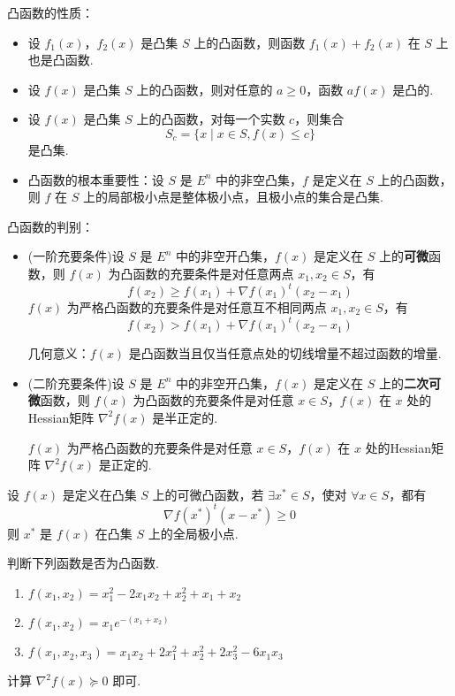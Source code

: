 \begin{theorem}
    凸函数的性质：
    \begin{itemize}
        \item 设 $f_1(x)$，$f_2(x)$ 是凸集 $S$ 上的凸函数，则函数 $f_1(x) + f_2(x)$ 在 $S$ 上也是凸函数.
        \item 设 $f(x)$ 是凸集 $S$ 上的凸函数，则对任意的 $a \ge 0$，函数 $af(x)$ 是凸的.
        \item 设 $f(x)$ 是凸集 $S$ 上的凸函数，对每一个实数 $c$，则集合 
        \[
            S_c = \{x \mid x \in S, f(x) \le c\}  
        \]
        是凸集.
        \item 凸函数的根本重要性：设 $S$ 是 $E^n$ 中的非空凸集，$f$ 是定义在 $S$ 上的凸函数，则 $f$ 在 $S$ 上的局部极小点是整体极小点，且极小点的集合是凸集.
    \end{itemize}
\end{theorem}

\begin{theorem}
    凸函数的判别：
    \begin{itemize}
        \item (一阶充要条件)设 $S$ 是 $E^n$ 中的非空开凸集，$f(x)$ 是定义在 $S$ 上的\textbf{可微}函数，则 $f(x)$ 为凸函数的充要条件是对任意两点 $x_1, x_2 \in S$，有 \[f(x_2) \ge f(x_1) + \nabla f(x_1)^t(x_2 - x_1)\]
        $f(x)$ 为严格凸函数的充要条件是对任意互不相同两点 $x_1, x_2 \in S$，有 \[f(x_2) > f(x_1) + \nabla f(x_1)^t(x_2 - x_1)\]

        几何意义：$f(x)$ 是凸函数当且仅当任意点处的切线增量不超过函数的增量.
        \item (二阶充要条件)设 $S$ 是 $E^n$ 中的非空开凸集，$f(x)$ 是定义在 $S$ 上的\textbf{二次可微}函数，则 $f(x)$ 为凸函数的充要条件是对任意 $x \in S$，$f(x)$ 在 $x$ 处的Hessian矩阵 $\nabla ^2f(x)$ 是半正定的.
        
        $f(x)$ 为严格凸函数的充要条件是对任意 $x \in S$，$f(x)$ 在 $x$ 处的Hessian矩阵 $\nabla ^2f(x)$ 是正定的.
    \end{itemize}
\end{theorem}

\begin{note}
    设 $f(x)$ 是定义在凸集 $S$ 上的可微凸函数，若 $\exists x^* \in S$，使对 $\forall x \in S$，都有 \[\nabla f(x^*)^t(x - x^*) \ge 0\]
    则 $x^*$ 是 $f(x)$ 在凸集 $S$ 上的全局极小点.
\end{note}

\begin{example}
    判断下列函数是否为凸函数.
    \begin{enumerate}
        \item $f(x_1, x_2) = x_1^2 - 2x_1x_2 + x_2^2 + x_1 + x_2$
        \item $f(x_1, x_2) = x_1e^{-(x_1 + x_2)}$
        \item $f(x_1, x_2, x_3) = x_1x_2 + 2x_1^2 + x_2^2 + 2x_3^2 - 6x_1x_3$
    \end{enumerate}
    \answer 计算 $\nabla^2f(x) \succeq 0$ 即可.
\end{example}

